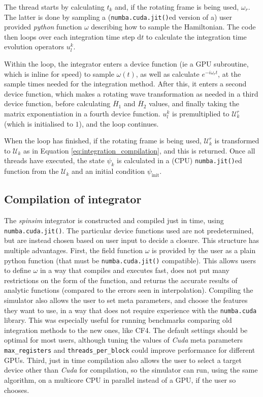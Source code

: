 \documentclass{jors}
\begin{document}
		The thread starts by calculating \(t_k\) and, if the rotating frame is being used, \(\omega_r\).
		The latter is done by sampling a (\texttt{numba.cuda.jit()}ed version of a) user provided \emph{python} function \(\omega\) describing how to sample the Hamiltonian.
		The code then loops over each integration time step \(\mathrm{d}t\) to calculate the integration time evolution operators \(u^k_l\).
		
		Within the loop, the integrator enters a device function (ie a GPU subroutine, which is inline for speed) to sample \(\omega(t)\), as well as calculate \(e^{-i \omega_r t}\), at the sample times needed for the integration method.
		After this, it enters a second device function, which makes a rotating wave transformation as needed in a third device function, before calculating \(\overline{H}_1\) and \(\overline{H}_2\) values, and finally taking the matrix exponentiation in a fourth device function.
		\(u^k_l\) is premultiplied to \(\mathcal{U}^r_k\) (which is initialised to \(1\)), and the loop continues.
		
		When the loop has finished, if the rotating frame is being used, \(\mathcal{U}^r_k\) is transformed to \(\mathcal{U}_k\) as in Equation \eqref{eq:integration_compilation}, and this is returned.
		Once all threads have executed, the state \(\psi_k\) is calculated in a (CPU) \texttt{numba.jit()}ed function from the \(\mathcal{U}_k\) and an initial condition \(\psi_{\mathrm{init}}\).


	\subsection{Compilation of integrator}
		The \emph{spinsim} integrator is constructed and compiled just in time, using \texttt{numba.cuda.jit()}.
		The particular device functions used are not predetermined, but are instead chosen based on user input to decide a closure.
		This structure has multiple advantages.
		First, the field function \(\omega\) is provided by the user as a plain python function (that must be \texttt{numba.cuda.jit()} compatible).
		This allows users to define \(\omega\) in a way that compiles and executes fast, does not put many restrictions on the form of the function, and returns the accurate results of analytic functions (compared to the errors seen in interpolation).
		Compiling the simulator also allows the user to set meta parameters, and choose the features they want to use, in a way that does not require experience with the \texttt{numba.cuda} library.
		This was especially useful for running benchmarks comparing old integration methods to the new ones, like CF4.
		The default settings should be optimal for most users, although tuning the values of \emph{Cuda} meta parameters \texttt{max\_registers} and \texttt{threads\_per\_block} could improve performance for different GPUs.
		Third, just in time compilation also allows the user to select a target device other than \emph{Cuda} for compilation, so the simulator can run, using the same algorithm, on a multicore CPU in parallel instead of a GPU, if the user so chooses.
		
\end{document}
